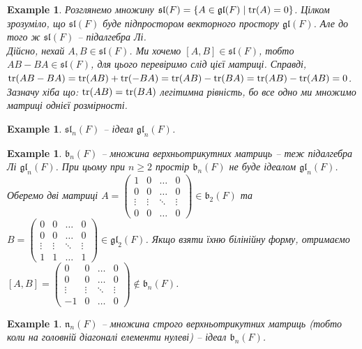 \documentclass[a4paper, 10pt]{article}
\theoremstyle{theoremdd}
\newtheorem{example}[theorem]{Example}
\begin{document}
\begin{example}
Розглянемо множину $\mathfrak{sl}(F) = \{ A \in \mathfrak{gl}(F) \mid \tr(A) = 0\}$. Цілком зрозуміло, що $\mathfrak{sl}(F)$ буде підпростором векторного простору $\mathfrak{gl}(F)$. Але до того ж $\mathfrak{sl}(F)$ -- підалгебра Лі.\\
Дійсно, нехай $A,B \in \mathfrak{sl}(F)$. Ми хочемо $[A,B] \in \mathfrak{sl}(F)$, тобто $AB - BA \in \mathfrak{sl}(F)$, для цього перевіримо слід цієї матриці. Справді,\\
$\tr(AB - BA) = \tr(AB) + \tr(-BA) = \tr(AB) - \tr(BA) = \tr(AB) - \tr(AB) = 0$.\\
Зазначу хіба що: $\tr(AB) = \tr(BA)$ легітимна рівність, бо все одно ми множимо матриці однієї розмірності.
\end{example}

\begin{example}
$\mathfrak{sl}_n(F)$ -- ідеал $\mathfrak{gl}_n(F)$.
\end{example}

\begin{example}
$\mathfrak{b}_n(F)$ -- множина верхньотрикутних матриць -- теж підалгебра Лі $\mathfrak{gl}_n(F)$. При цьому при $n \geq 2$ простір $\mathfrak{b}_n(F)$ не буде ідеалом $\mathfrak{gl}_n(F)$.\\
Оберемо дві матриці $A = \begin{pmatrix}
1 & 0 & \dots & 0 \\
0 & 0 & \dots & 0 \\
\vdots & \vdots & \ddots & \vdots \\
0 & 0 & \dots & 0
\end{pmatrix} \in \mathfrak{b}_2(F)$ та $B = \begin{pmatrix}
0 & 0 & \dots & 0 \\
0 & 0 & \dots & 0 \\
\vdots & \vdots & \ddots & \vdots \\
1 & 1 & \dots & 1
\end{pmatrix} \in \mathfrak{gl}_2(F)$. Якщо взяти їхню білінійну форму, отримаємо $[A,B] = \begin{pmatrix}
0 & 0 & \dots & 0 \\
0 & 0 & \dots & 0 \\
\vdots & \vdots & \ddots & \vdots \\
-1 & 0 & \dots & 0
\end{pmatrix} \notin \mathfrak{b}_n(F)$.
\end{example}

\begin{example}
$\mathfrak{n}_n(F)$ -- множина строго верхньотрикутних матриць (тобто коли на головній діагоналі елементи нулеві) -- ідеал $\mathfrak{b}_n(F)$.
\end{example}
\end{document}
